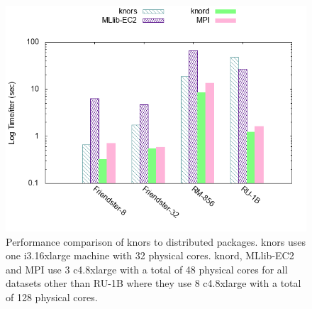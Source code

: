 \documentclass[simplex.tex]{subfiles}
\begin{document}
\begin{figure}[!h]
\begin{cframed}
    \centering
    \includegraphics[width=.5\textwidth]{../../figs/perf.iter.sem-ec2.png}
\caption{Performance comparison of \textsf{knors} to distributed packages.
\textsf{knors} uses one i3.16xlarge machine with 32 physical cores.
\textsf{knord}, MLlib-EC2 and MPI use 3 c4.8xlarge with a total of 48 physical
cores for all datasets other than RU-1B where they use 8 c4.8xlarge with a
total of 128 physical cores.}
\label{fig:sem-ec2}

\end{cframed}
\end{figure}
\clearpage
\end{document}
